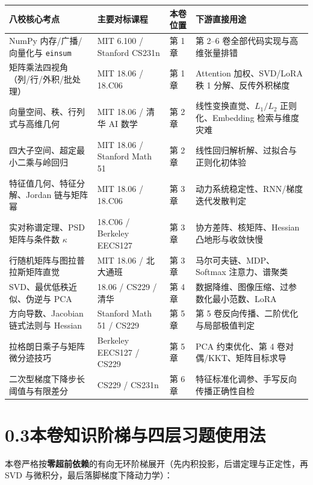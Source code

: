 \begin{center}
\footnotesize
\begin{tabularx}{\linewidth}{@{}p{34mm}p{34mm}p{16mm}X@{}}
\toprule
\textbf{八校核心考点} & \textbf{主要对标课程} & \textbf{本卷位置} & \textbf{下游直接用途} \\
\midrule
NumPy 内存/广播/向量化与 \texttt{einsum} & MIT 6.100 / Stanford CS231n & 第 1 章 & 第 2--6 卷全部代码实现与高维张量排错 \\
矩阵乘法四视角（列/行/外积/批处理） & MIT 18.06 / 18.C06 & 第 1 章 & Attention 加权、SVD/LoRA 秩 1 分解、反传外积梯度 \\
向量空间、秩、行列式与高维几何 & MIT 18.06 / 清华 AI 数学 & 第 2 章 & 线性变换直觉、$L_1/L_2$ 正则化、Embedding 检索与维度灾难 \\
四大子空间、超定最小二乘与岭回归 & MIT 18.06 / Stanford Math 51 & 第 2 章 & 线性回归解析解、过拟合与正则化初体验 \\
特征值几何、特征分解、Jordan 链与矩阵幂 & MIT 18.06 / 18.C06 & 第 3 章 & 动力系统稳定性、RNN/梯度迭代发散判定 \\
实对称谱定理、PSD 矩阵与条件数 $\kappa$ & 18.C06 / Berkeley EECS127 & 第 3 章 & 协方差阵、核矩阵、Hessian 凸地形与收敛快慢 \\
行随机矩阵与图拉普拉斯矩阵直觉 & MIT 18.06 / 北大通班 & 第 3 章 & 马尔可夫链、MDP、Softmax 注意力、谱聚类 \\
SVD、最优低秩近似、伪逆与 PCA & 18.06 / CS229 / 清华 & 第 4 章 & 数据降维、图像压缩、过参数化最小范数、LoRA \\
方向导数、Jacobian 链式法则与 Hessian & Stanford Math 51 / CS229 & 第 5 章 & 第 5 卷反向传播、二阶优化与局部极值判定 \\
拉格朗日乘子与矩阵微分迹技巧 & Berkeley EECS127 / CS229 & 第 5 章 & PCA 约束优化、第 4 卷对偶/KKT、矩阵目标求导 \\
二次型梯度下降步长阈值与有限差分 & CS229 / CS231n & 第 6 章 & 特征标准化调参、手写反向传播正确性自检 \\
\bottomrule
\end{tabularx}
\end{center}

\section*{0.3\quad 本卷知识阶梯与四层习题使用法}

本卷严格按\textbf{零超前依赖}的有向无环阶梯展开（先内积投影，后谱定理与正定性，再 SVD 与微积分，最后落脚梯度下降动力学）：

